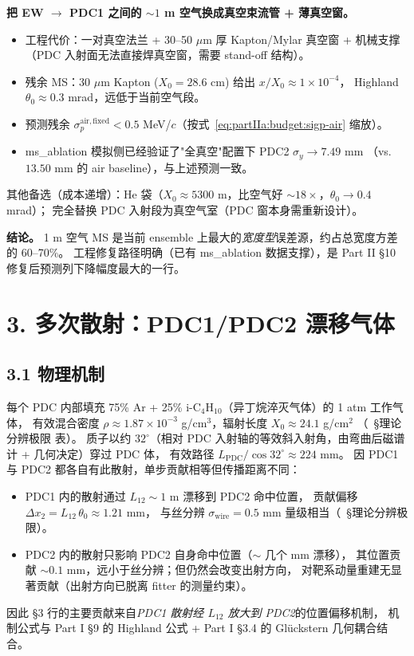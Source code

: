 \textbf{把 EW $\to$ PDC1 之间的 $\sim 1$ m 空气换成真空束流管 + 薄真空窗。}
\begin{itemize}
  \item 工程代价：一对真空法兰 + 30--50 $\mu$m 厚 Kapton/Mylar 真空窗 +
        机械支撑（PDC 入射面无法直接焊真空窗，需要 stand-off 结构）。
  \item 残余 MS：30 $\mu$m Kapton ($X_0=28.6$ cm) 给出 $x/X_0\approx 1\times 10^{-4}$，
        Highland $\theta_0\approx 0.3$ mrad，远低于当前空气段。
  \item 预测残余 $\sigma_p^\mathrm{air, fixed} < 0.5$ MeV/$c$（按式~\eqref{eq:partIIa:budget:sigp-air} 缩放）。
  \item ms\_ablation 模拟侧已经验证了"全真空"配置下 PDC2 $\sigma_y \to 7.49$ mm
        （vs.~$13.50$ mm 的 air baseline），与上述预测一致。
\end{itemize}
其他备选（成本递增）：He 袋（$X_0\approx 5300$ m，比空气好 $\sim 18\times$，$\theta_0\to 0.4$ mrad）；
完全替换 PDC 入射段为真空气室（PDC 窗本身需重新设计）。

\textbf{结论。} 1 m 空气 MS 是当前 ensemble 上最大的\emph{宽度型}误差源，约占总宽度方差的 60--70\%。
工程修复路径明确（已有 ms\_ablation 数据支撑），是 Part II §10 修复后预测列下降幅度最大的一行。

\section{3. 多次散射：PDC1/PDC2 漂移气体}
\label{sec:partIIa:budget:pdc-gas-ms}

\subsection*{3.1 物理机制}

每个 PDC 内部填充 75\% Ar + 25\% i-C$_4$H$_{10}$（异丁烷淬灭气体）的 1 atm 工作气体，
有效混合密度 $\rho \approx 1.87\times 10^{-3}$ g/cm$^3$，辐射长度 $X_0 \approx 24.1$ g/cm$^2$
（\StatusReport{}~§理论分辨极限 表）。
质子以约 $32^\circ$（相对 PDC 入射轴的等效斜入射角，由弯曲后磁谱计 + 几何决定）穿过 PDC 体，
有效路径 $L_\mathrm{PDC}/\cos 32^\circ \approx 224$ mm。
因 PDC1 与 PDC2 都各自有此散射，单步贡献相等但传播距离不同：
\begin{itemize}
  \item PDC1 内的散射通过 $L_{12}\sim 1$ m 漂移到 PDC2 命中位置，
        贡献偏移 $\Delta x_2 = L_{12}\,\theta_0 \approx 1.21$ mm，
        与丝分辨 $\sigma_\mathrm{wire}=0.5$ mm 量级相当（\StatusReport{}~§理论分辨极限）。
  \item PDC2 内的散射只影响 PDC2 自身命中位置（$\sim$ 几个 mm 漂移），
        其位置贡献 $\sim 0.1$ mm，远小于丝分辨；但仍然会改变出射方向，
        对靶系动量重建无显著贡献（出射方向已脱离 fitter 的测量约束）。
\end{itemize}
因此 §3 行的主要贡献来自\emph{PDC1 散射经 $L_{12}$ 放大到 PDC2}的位置偏移机制，
机制公式与 Part I §9 的 Highland 公式 + Part I §3.4 的 Glückstern 几何耦合结合。

